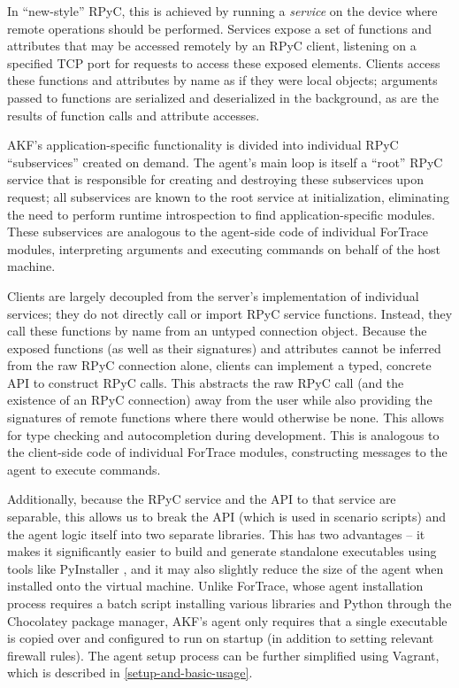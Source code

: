 In ``new-style'' RPyC, this is achieved by running a \emph{service} on
the device where remote operations should be performed. Services expose
a set of functions and attributes that may be accessed remotely by an
RPyC client, listening on a specified TCP port for requests to access
these exposed elements. Clients access these functions and attributes by
name as if they were local objects; arguments passed to functions are
serialized and deserialized in the background, as are the results of
function calls and attribute accesses.

AKF's application-specific functionality is divided into individual RPyC
``subservices'' created on demand. The agent's main loop is itself a
``root'' RPyC service that is responsible for creating and destroying
these subservices upon request; all subservices are known to the root
service at initialization, eliminating the need to perform runtime
introspection to find application-specific modules. These subservices
are analogous to the agent-side code of individual ForTrace modules,
interpreting arguments and executing commands on behalf of the host
machine.

Clients are largely decoupled from the server's implementation of
individual services; they do not directly call or import RPyC service
functions. Instead, they call these functions by name from an untyped
connection object. Because the exposed functions (as well as their
signatures) and attributes cannot be inferred from the raw RPyC
connection alone, clients can implement a typed, concrete API to
construct RPyC calls. This abstracts the raw RPyC call (and the
existence of an RPyC connection) away from the user while also providing
the signatures of remote functions where there would otherwise be none.
This allows for type checking and autocompletion during development.
This is analogous to the client-side code of individual ForTrace
modules, constructing messages to the agent to execute commands.

Additionally, because the RPyC service and the API to that service are
separable, this allows us to break the API (which is used in scenario
scripts) and the agent logic itself into two separate libraries. This
has two advantages -- it makes it significantly easier to build and
generate standalone executables using tools like PyInstaller
\cite{PyinstallerPyinstaller2025}, and it may also slightly reduce
the size of the agent when installed onto the virtual machine. Unlike
ForTrace, whose agent installation process requires a batch script
installing various libraries and Python through the Chocolatey package
manager, AKF's agent only requires that a single executable is copied
over and configured to run on startup (in addition to setting relevant
firewall rules). The agent setup process can be further simplified using
Vagrant, which is described in \autoref{setup-and-basic-usage}.

